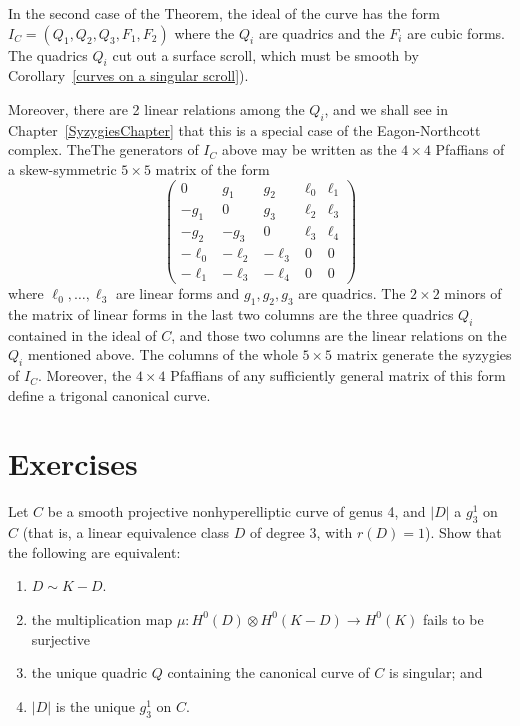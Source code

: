 \begin{fact}
In the second case of the Theorem, the ideal of the curve has the form $I_C = (Q_1, Q_2, Q_3, F_1, F_2)$ 
where the $Q_i$ are quadrics and the $F_i$ are cubic forms. The quadrics $Q_i$ cut out a surface scroll, which
must be smooth by Corollary~\ref{curves on a singular scroll}).

Moreover, there are 2 linear relations among the
$Q_i$, and we shall see in Chapter~\ref{SyzygiesChapter} that this is a special case of the Eagon-Northcott
complex. TheThe generators of $I_C$ above may be written as the $4\times 4$ Pfaffians
of a skew-symmetric $5\times 5$ matrix of the form
$$
\begin{pmatrix}
0&g_1&g_2&\ell_0&\ell_1\\
-g_1&0&g_3&\ell_2&\ell_3\\
-g_2&-g_3&0 &\ell_3&\ell_4\\
-\ell_0&-\ell_2&-\ell_3&0&0\\
-\ell_1&-\ell_3&-\ell_4&0&0
\end{pmatrix}
$$
where $\ell_0,\dots,\ell_3$ are linear forms and $g_1, g_2, g_3$ are quadrics. The
 $2\times 2$
minors of the matrix of linear forms in the last two columns are the three quadrics $Q_i$ contained in the ideal
of $C$, and those two columns are the linear relations on the $Q_i$ mentioned above.
The columns of the whole $5\times 5$ matrix generate the syzygies of $I_C$. Moreover, the
$4\times 4$ Pfaffians of any sufficiently general matrix of this form define a trigonal canonical curve.
\end{fact}



\section{Exercises}

\begin{exercise} \label{ex7.1}
Let $C$ be a smooth projective nonhyperelliptic curve of genus 4, and $|D|$ a $g^1_3$ on $C$ (that is, a linear equivalence class $D$ of degree 3, with $r(D) = 1$). Show that the following are equivalent:
\begin{enumerate}
\item $D \sim K-D$. 
\item the multiplication map $\mu : H^0(D) \otimes H^0(K-D) \to H^0(K)$ fails to be surjective
\item the unique quadric $Q$ containing the canonical curve of $C$ is singular; and
\item $|D|$ is the unique $g^1_3$ on $C$.
\end{enumerate}
\end{exercise}

